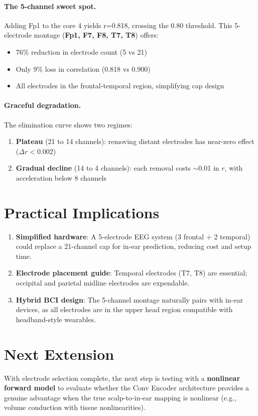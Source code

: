 \documentclass[11pt,a4paper]{article}
\begin{document}
\paragraph{The 5-channel sweet spot.}
Adding Fp1 to the core 4 yields r=0.818, crossing the 0.80 threshold.
This 5-electrode montage (\textbf{Fp1, F7, F8, T7, T8}) offers:
\begin{itemize}
  \item 76\% reduction in electrode count (5 vs 21)
  \item Only 9\% loss in correlation (0.818 vs 0.900)
  \item All electrodes in the frontal-temporal region, simplifying cap design
\end{itemize}

\paragraph{Graceful degradation.}
The elimination curve shows two regimes:
\begin{enumerate}
  \item \textbf{Plateau} (21 to 14 channels): removing distant electrodes
    has near-zero effect ($\Delta r < 0.002$)
  \item \textbf{Gradual decline} (14 to 4 channels): each removal costs
    $\sim$0.01 in $r$, with acceleration below 8 channels
\end{enumerate}

\section{Practical Implications}

\begin{enumerate}
  \item \textbf{Simplified hardware}: A 5-electrode EEG system (3 frontal +
    2 temporal) could replace a 21-channel cap for in-ear prediction, reducing
    cost and setup time.

  \item \textbf{Electrode placement guide}: Temporal electrodes (T7, T8) are
    essential; occipital and parietal midline electrodes are expendable.

  \item \textbf{Hybrid BCI design}: The 5-channel montage naturally pairs with
    in-ear devices, as all electrodes are in the upper head region compatible
    with headband-style wearables.
\end{enumerate}

\section{Next Extension}

With electrode selection complete, the next step is testing with a
\textbf{nonlinear forward model} to evaluate whether the Conv Encoder
architecture provides a genuine advantage when the true scalp-to-in-ear
mapping is nonlinear (e.g., volume conduction with tissue nonlinearities).
\end{document}
